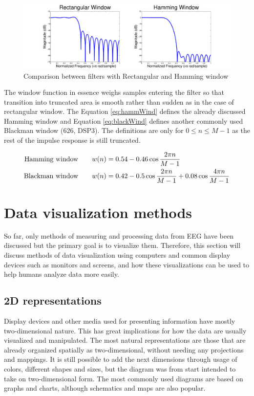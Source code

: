 \begin{figure}[ht]
	\centering
	\includegraphics[width=1\linewidth]{fig/filterRiples.pdf}
	\caption{Comparison between filters with Rectangular and Hamming window}
	\label{fig:filterRiples}
\end{figure}

The window function in essence weighs samples entering the filter so that transition into truncated area is smooth rather than sudden as in the case of rectangular window. The Equation \ref{eq:hammWind} defines the already discussed Hamming window and Equation \ref{eq:blackWind} defines another commonly used Blackman window (626, DSP3). The definitions are only for $0 \leq n \leq M-1$ as the rest of the impulse response is still truncated.

\begin{align}
\text{Hamming window\qquad}& w(n) = 0.54 - 0.46\cos \frac{2 \pi n}{M -1} \label{eq:hammWind}\\
\text{Blackman window\qquad}& w(n) = 0.42 - 0.5\cos \frac{2 \pi n}{M - 1} + 0.08\cos \frac{4 \pi n}{M - 1} \label{eq:blackWind}
\end{align}

\section{Data visualization methods}
So far, only methods of measuring and processing data from EEG have been
discussed but the primary goal is to visualize them. Therefore, this section
will discuss methods of data visualization using computers and common
display devices such as monitors and screens, and how these visualizations can
be used to help humans analyze data more easily.

\subsection{2D representations}
Display devices and other media used for presenting information have mostly
two-dimensional nature. This has great implications for how the data are usually
visualized and manipulated. The most natural representations are those that are
already organized spatially as two-dimensional, without needing any projections
and mappings. It is still possible to add the next dimensions through usage of
colors, different shapes and sizes, but the diagram was from start intended to
take on two-dimensional form. The most commonly used diagrams are based on
graphs and charts, although schematics and maps are also popular.

